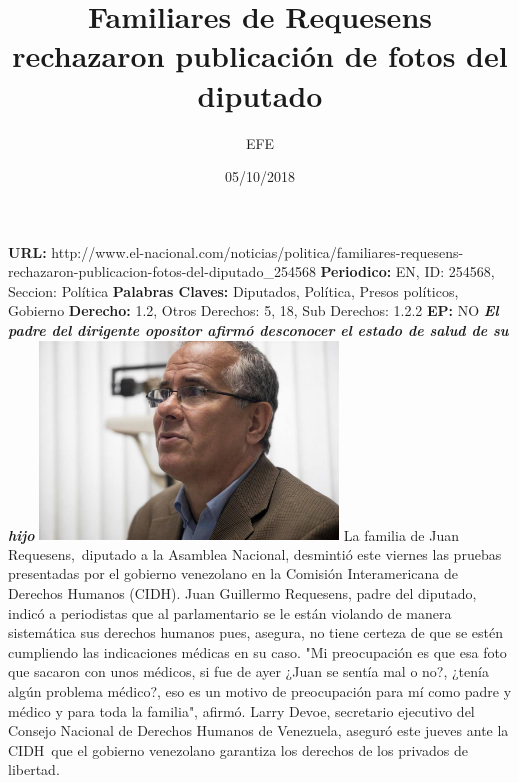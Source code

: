 \documentclass{article}%
\title{\textbf{Familiares de Requesens rechazaron publicación de fotos del diputado}}%
\author{EFE}%
\date{05/10/2018}%
\begin{document}
%
\normalsize%
\maketitle%
\textbf{URL: }%
http://www.el{-}nacional.com/noticias/politica/familiares{-}requesens{-}rechazaron{-}publicacion{-}fotos{-}del{-}diputado\_254568\newline%
%
\textbf{Periodico: }%
EN, %
ID: %
254568, %
Seccion: %
Política\newline%
%
\textbf{Palabras Claves: }%
Diputados, Política, Presos políticos, Gobierno\newline%
%
\textbf{Derecho: }%
1.2, %
Otros Derechos: %
5, 18, %
Sub Derechos: %
1.2.2\newline%
%
\textbf{EP: }%
NO\newline%
\newline%
%
\textbf{\textit{El padre del dirigente opositor afirmó desconocer el estado de salud de su hijo}}%
\newline%
\newline%
%
\includegraphics[width=300px]{164.jpg}%
\newline%
%
La familia de Juan Requesens,~diputado a la Asamblea Nacional, desmintió este viernes las pruebas presentadas por el gobierno venezolano en la Comisión Interamericana de Derechos Humanos (CIDH).%
\newline%
%
Juan Guillermo Requesens, padre del diputado, indicó a periodistas que al parlamentario se le están violando de manera sistemática sus derechos humanos pues, asegura, no tiene certeza de que se estén cumpliendo las indicaciones médicas en su caso.%
\newline%
%
"Mi preocupación es que esa foto que sacaron con unos médicos, si fue de ayer ¿Juan se sentía mal o no?, ¿tenía algún problema médico?, eso es un motivo de preocupación para mí como padre y médico y para toda la familia", afirmó.%
\newline%
%
Larry Devoe, secretario ejecutivo del Consejo Nacional de Derechos Humanos de Venezuela, aseguró este jueves ante la CIDH~que el gobierno venezolano garantiza los derechos de los privados de libertad.%
\end{document}
